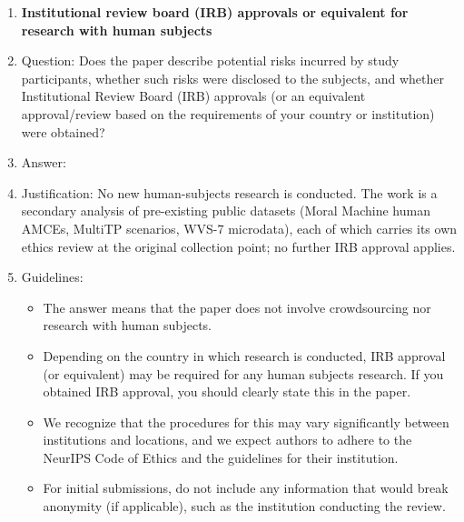 \begin{enumerate}
\item {\bf Institutional review board (IRB) approvals or equivalent for research with human subjects}
    \item[] Question: Does the paper describe potential risks incurred by study participants, whether such risks were disclosed to the subjects, and whether Institutional Review Board (IRB) approvals (or an equivalent approval/review based on the requirements of your country or institution) were obtained?
    \item[] Answer: \answerNA{}
    \item[] Justification: No new human-subjects research is conducted. The work is a secondary analysis of pre-existing public datasets (Moral Machine human AMCEs, MultiTP scenarios, WVS-7 microdata), each of which carries its own ethics review at the original collection point; no further IRB approval applies.
    \item[] Guidelines:
    \begin{itemize}
        \item The answer \answerNA{} means that the paper does not involve crowdsourcing nor research with human subjects.
        \item Depending on the country in which research is conducted, IRB approval (or equivalent) may be required for any human subjects research. If you obtained IRB approval, you should clearly state this in the paper. 
        \item We recognize that the procedures for this may vary significantly between institutions and locations, and we expect authors to adhere to the NeurIPS Code of Ethics and the guidelines for their institution. 
        \item For initial submissions, do not include any information that would break anonymity (if applicable), such as the institution conducting the review.
    \end{itemize}


\end{enumerate}
